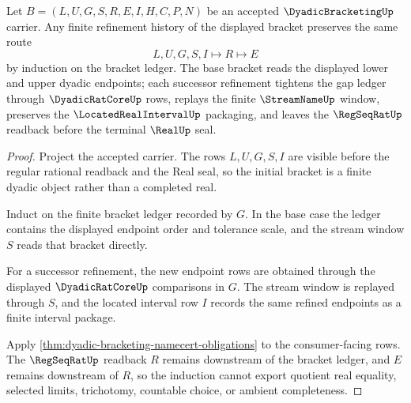 \begin{theorem}
\label{thm:dyadic-bracketing-finite-bracket-induction}
Let $B=(L,U,G,S,R,E,I,H,C,P,N)$ be an accepted $\DyadicBracketingUp$ carrier. Any finite refinement history of the displayed bracket preserves the same route
$$
L,U,G,S,I \longmapsto R \longmapsto E
$$
by induction on the bracket ledger. The base bracket reads the displayed lower and upper dyadic endpoints; each successor refinement tightens the gap ledger through $\DyadicRatCoreUp$ rows, replays the finite $\StreamNameUp$ window, preserves the $\LocatedRealIntervalUp$ packaging, and leaves the $\RegSeqRatUp$ readback before the terminal $\RealUp$ seal.
\end{theorem}
\begin{proof}
Project the accepted carrier. The rows $L,U,G,S,I$ are visible before the regular rational readback and the Real seal, so the initial bracket is a finite dyadic object rather than a completed real.

Induct on the finite bracket ledger recorded by $G$. In the base case the ledger contains the displayed endpoint order and tolerance scale, and the stream window $S$ reads that bracket directly.

For a successor refinement, the new endpoint rows are obtained through the displayed $\DyadicRatCoreUp$ comparisons in $G$. The stream window is replayed through $S$, and the located interval row $I$ records the same refined endpoints as a finite interval package.

Apply \autoref{thm:dyadic-bracketing-namecert-obligations} to the consumer-facing rows. The $\RegSeqRatUp$ readback $R$ remains downstream of the bracket ledger, and $E$ remains downstream of $R$, so the induction cannot export quotient real equality, selected limits, trichotomy, countable choice, or ambient completeness.
\end{proof}

